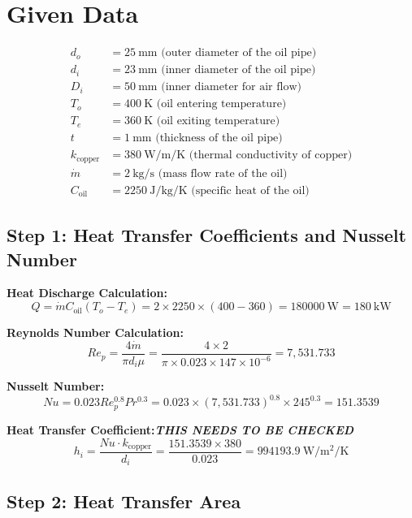 \documentclass{article}
\begin{document}
\section*{Given Data}
\begin{align*}
d_o & = \SI{25}{\milli\meter} \text{ (outer diameter of the oil pipe)}\\
d_i & = \SI{23}{\milli\meter} \text{ (inner diameter of the oil pipe)}\\
D_i & = \SI{50}{\milli\meter} \text{ (inner diameter for air flow)}\\
T_o & = \SI{400}{\kelvin} \text{ (oil entering temperature)}\\
T_e & = \SI{360}{\kelvin} \text{ (oil exiting temperature)}\\
t & = \SI{1}{\milli\meter} \text{ (thickness of the oil pipe)}\\
k_{\text{copper}} & = \SI{380}{\watt\per\meter\per\kelvin} \text{ (thermal conductivity of copper)}\\
\dot{m} & = \SI{2}{\kilogram\per\second} \text{ (mass flow rate of the oil)}\\
C_{\text{oil}} & = \SI{2250}{\joule\per\kilogram\per\kelvin} \text{ (specific heat of the oil)}
\end{align*}

\subsection*{Step 1: Heat Transfer Coefficients and Nusselt Number}

\textbf{Heat Discharge Calculation:}
\[
Q = \dot{m} C_{\text{oil}} (T_o - T_e) = 2 \times 2250 \times (400 - 360) = \SI{180000}{\watt} = \SI{180}{\kilo\watt}
\]

\textbf{Reynolds Number Calculation:}
\[
Re_p = \frac{4 \dot{m}}{\pi d_i \mu} = \frac{4 \times 2}{\pi \times 0.023 \times 147 \times 10^{-6}} = 7,531.733
\]

\textbf{Nusselt Number:}
\[
Nu = 0.023Re_p^{0.8}Pr^{0.3} = 0.023 \times (7,531.733)^{0.8} \times 245^{0.3} = 151.3539
\]

\textbf{Heat Transfer Coefficient:\textit{THIS NEEDS TO BE CHECKED}}
\[
h_i = \frac{Nu \cdot k_{\text{copper}}}{d_i} = \frac{151.3539 \times 380}{0.023} = \SI{994193.9}{\watt\per\meter\squared\per\kelvin}
\]

\subsection*{Step 2: Heat Transfer Area}
\end{document}
